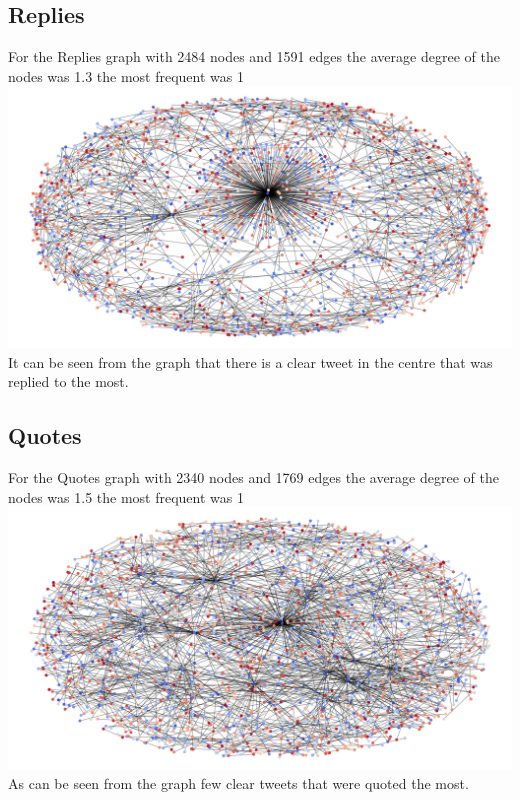 \documentclass[10pt,a4paper]{article}
\begin{document}
 	\subsection*{Replies}
	For the Replies graph with 2484 nodes and 1591 edges the average degree of the nodes was 1.3 the most frequent was 1 	
 	 	\includegraphics[width=\textwidth]{images/replies_graph.png} 
 	 	It can be seen from the graph that there is a clear tweet in the centre that was replied to the most.
 	\subsection*{Quotes}
	For the Quotes graph with 2340 nodes and 1769 edges the average degree of the nodes was 1.5 the most frequent was 1
	\includegraphics[width=\textwidth]{images/quotes_graph.png} 
	As can be seen from the graph few clear tweets that were quoted the most.
\end{document}

